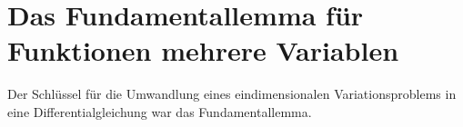%
%
%
\section{Das Fundamentallemma für Funktionen mehrere Variablen
\label{buch:felder:section:fundamentallemma}}
Der Schlüssel für die Umwandlung eines eindimensionalen Variationsproblems
in eine Differentialgleichung war das Fundamentallemma.






